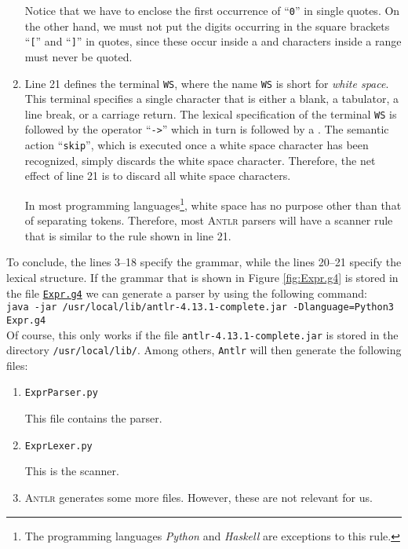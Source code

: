 \begin{enumerate}
      Notice that we have to enclose the first occurrence of ``\texttt{0}'' in single quotes.
      On the other hand, we must not put the digits occurring in the square brackets ``\texttt{[}'' 
      and ``\texttt{]}'' in quotes, since these occur inside a  and characters inside a range
      must never be quoted.
\item Line 21 defines the terminal \texttt{WS}, where the name \texttt{WS} is short for \emph{white space}. This terminal
      specifies a single character that is either a blank, a tabulator, a line break, or a carriage return.
      The lexical specification of the terminal \texttt{WS} is followed by the operator ``\texttt{->}'' 
      which in turn is followed by a .
      The semantic action ``\texttt{skip}'', which is executed once a white space character has been recognized, 
      simply discards the white space character.  Therefore, the net effect of line 21 is to discard all white
      space characters. 

      In most programming languages\footnote{
        The programming languages \textsl{Python} and \textsl{Haskell} are exceptions to this rule.},
      white space has no purpose other than that of separating  tokens.  
      Therefore, most \textsc{Antlr} parsers will have a scanner rule that is similar to
      the rule shown in line 21. 
\end{enumerate}
To conclude, the lines 3--18 specify the grammar, while the lines 20--21 specify the 
lexical structure.  If the grammar that is shown in Figure \ref{fig:Expr.g4} is stored in the file
\href{https://github.com/karlstroetmann/Formal-Languages/blob/master/ANTLR4-Python/PureExprParser/Expr.g4}{\texttt{Expr.g4}} 
we can generate a parser by using the following command:
\\[0.2cm]
\hspace*{1.3cm}
\texttt{java -jar /usr/local/lib/antlr-4.13.1-complete.jar -Dlanguage=Python3 Expr.g4}
\\[0.2cm]
Of course, this only works if the file \texttt{antlr-4.13.1-complete.jar} is stored in the directory
\texttt{/usr/local/lib/}.  Among others, \texttt{Antlr} will then generate the following files:
\begin{enumerate}
\item \texttt{ExprParser.py}

      This file contains the parser.
\item \texttt{ExprLexer.py}

      This is the scanner.
\item \textsc{Antlr} generates some more files.  However, these are not relevant for us.
\end{enumerate}

